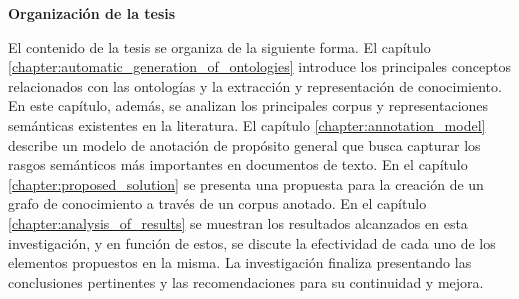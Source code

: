\noindent\textbf{\large Organización de la tesis}

El contenido de la tesis se organiza de la siguiente forma. El capítulo \ref{chapter:automatic_generation_of_ontologies} introduce los principales conceptos relacionados con las ontologías y la extracción y representación de conocimiento. En este capítulo, además, se analizan los principales corpus y representaciones semánticas existentes en la literatura. El capítulo \ref{chapter:annotation_model} describe un modelo de anotación de propósito general que busca capturar los rasgos semánticos más importantes en documentos de texto. En el capítulo \ref{chapter:proposed_solution} se presenta una propuesta para la creación de un grafo de conocimiento a través de un corpus anotado. En el capítulo \ref{chapter:analysis_of_results} se muestran los resultados alcanzados en esta investigación, y en función de estos, se discute la efectividad de cada uno de los elementos propuestos en la misma. La investigación finaliza presentando las conclusiones pertinentes y las recomendaciones para su continuidad y mejora.